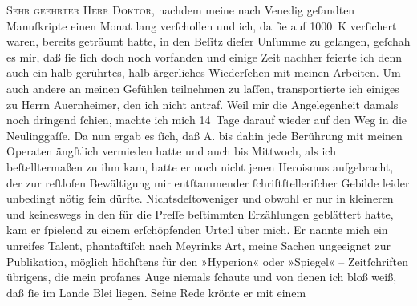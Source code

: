 \pstart{}\textsc{Sehr geehrter Herr Doktor,}\pend\vspace{0.5em}
\pstart
           nachdem meine nach Venedig geſandten Manuſkripte
               einen Monat lang verſchollen und ich, da{ }ſie auf 1000 K verſichert waren, bereits
               geträumt hatte, in den Beſitz dieſer Unſumme zu gelangen, geſchah es mir, daß{ }ſie{ }ſich doch noch vorfanden und einige Zeit nachher feierte ich denn auch ein halb
               gerührtes, halb ärgerliches Wiederſehen mit meinen Arbeiten. Um auch andere an meinen
               Gefühlen teilnehmen zu laſſen, transportierte ich einiges zu Herrn Auernheimer, den ich nicht antraf. Weil mir die
               Angelegenheit {\pb}damals noch dringend{ }ſchien, machte ich mich 14 Tage darauf wieder auf den Weg in die Neulinggaſſe. Da nun ergab es{ }ſich, daß A. bis dahin jede Berührung mit meinen Operaten ängſtlich
               vermieden hatte und auch bis Mittwoch, als ich beſtelltermaßen zu ihm
               kam, hatte er noch nicht jenen Heroismus aufgebracht, der zur reſtloſen Bewältigung
               mir entſtammender{ }ſchriftſtelleriſcher Gebilde leider unbedingt nötig{ }ſein dürfte.
               Nichtsdeſtoweniger und obwohl er nur in kleineren und keineswegs in den für die Preſſe beſtimmten Erzählungen geblättert hatte,
               kam er{ }ſpielend zu einem erſchöpfenden Urteil über mich. Er nannte mich ein unreifes
               Talent, phantaſtiſch nach Meyrinks Art, meine
               Sachen ungeeignet zur Publikation, möglich höchſtens für den »Hyperion« oder »Spiegel« –
               Zeitſchriften {\pb}übrigens, die mein profanes
               Auge niemals{ }ſchaute und von denen ich bloß weiß, daß{ }ſie im Lande Blei liegen. Seine Rede krönte er mit einem
